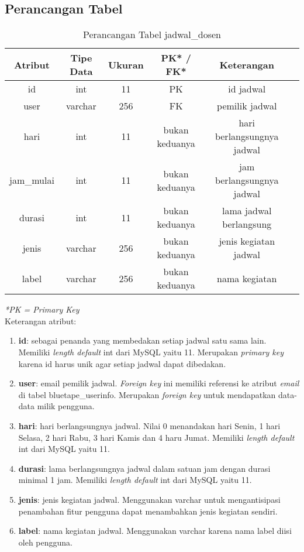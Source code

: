 \subsection{Perancangan Tabel}
\begin{center}
	\begin{table}[H]
	\begin{tabular}{|c|c|c|c|c|c|}
 			\hline
		\textbf{Atribut} & \textbf{Tipe Data} & \textbf{Ukuran} & \textbf{PK* / FK*}  & \textbf{Keterangan} \\
			\hline
		 id & int & 11 & PK &  id jadwal\\
			 \hline
			 user & varchar & 256 & FK &   pemilik jadwal\\
			 \hline
			 hari & int & 11 & bukan keduanya &   hari berlangsungnya jadwal\\
			 \hline
			 jam\_mulai & int & 11 & bukan keduanya &  jam berlangsungnya jadwal\\
			 \hline
			 durasi & int & 11 & bukan keduanya &  lama jadwal berlangsung\\
			 \hline
			 jenis & varchar & 256 & bukan keduanya &  jenis kegiatan jadwal\\
			 \hline
			 label & varchar & 256 & bukan keduanya &   nama kegiatan\\
			 \hline
	\end{tabular}
	\caption{Perancangan Tabel jadwal\_dosen}
	\end{table}
\end{center}
\textit{*PK = Primary Key} \\
Keterangan atribut:
	\begin{enumerate}
		\item \textbf{id}: sebagai penanda yang membedakan setiap jadwal satu sama lain. Memiliki \textit{length default} int dari MySQL yaitu 11. Merupakan \textit{primary key} karena id harus unik agar setiap jadwal dapat dibedakan.
		\item \textbf{user}: email pemilik jadwal. \textit{Foreign key }ini memiliki referensi ke atribut \textit{email} di tabel bluetape\_userinfo. Merupakan \textit{foreign key} untuk mendapatkan data-data milik pengguna.
		\item \textbf{hari}: hari berlangsungnya jadwal. Nilai 0 menandakan hari Senin, 1 hari Selasa, 2 hari Rabu, 3 hari Kamis dan 4 haru Jumat.  Memiliki \textit{length default} int dari MySQL yaitu 11.
		\item \textbf{durasi}: lama berlangsungnya jadwal dalam satuan jam dengan durasi minimal 1 jam.  Memiliki \textit{length default} int dari MySQL yaitu 11.
		\item \textbf{jenis}: jenis kegiatan jadwal. Menggunakan varchar untuk mengantisipasi penambahan fitur pengguna dapat menambahkan jenis kegiatan sendiri.
		\item \textbf{label}: nama kegiatan jadwal. Menggunakan varchar karena nama label diisi oleh pengguna.
	\end{enumerate}

